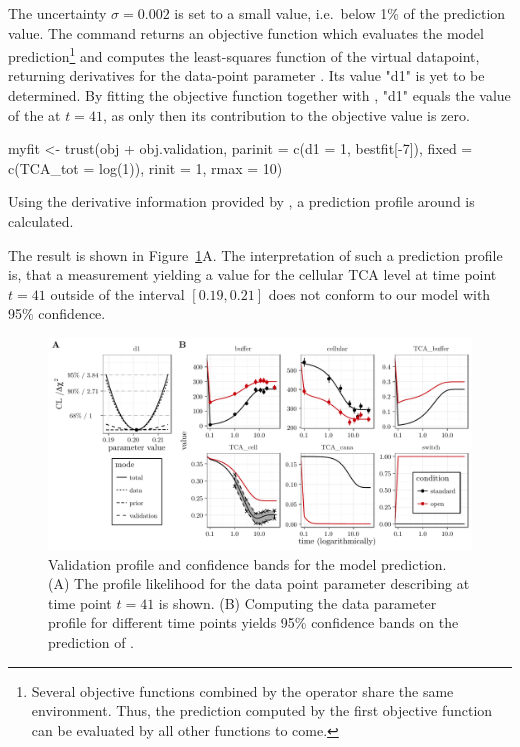 \documentclass[article]{jss}
\begin{document}
The uncertainty $\sigma = 0.002$ is set to a small
value, i.e.~below 1\% of the prediction value. The 
command returns an objective function which evaluates the model prediction\footnote{Several objective functions combined by the  operator
share the same environment. Thus, the prediction computed by the first
objective function can be evaluated by all other functions to come.} and
computes the least-squares function of the virtual datapoint, returning
derivatives for the data-point parameter . Its value "d1" is yet to be
determined. By fitting the objective function  together with
, "d1" equals the value of the  at
$t=41$, as only then its contribution to the objective value is zero.
\begin{CodeChunk}
\begin{CodeInput}
myfit <- trust(obj + obj.validation,
	       parinit = c(d1 = 1, bestfit[-7]),
	       fixed = c(TCA_tot = log(1)),
	       rinit = 1, rmax = 10)
\end{CodeInput}
\end{CodeChunk}
Using the derivative information provided by , a
prediction profile around  is calculated.
\begin{CodeChunk}
\end{CodeChunk}

The result is shown in Figure~\ref{fig:validation}A. The interpretation of
such a prediction profile is, that a measurement yielding a value for the
cellular TCA level at time point $t=41$ outside of the interval $[0.19,0.21]$
does not conform to our model with 95\% confidence.

\begin{figure}[ht]
	\centering
	\includegraphics[width = \textwidth]{images/figure9}
	\caption{Validation profile and confidence bands for the model prediction.
(A) The profile likelihood for the data point parameter  describing
 at time point $t = 41$ is shown. (B) Computing the data
parameter profile for different time points yields 95\% confidence bands on the
prediction of .}
	\label{fig:validation}
\end{figure}
\end{document}
